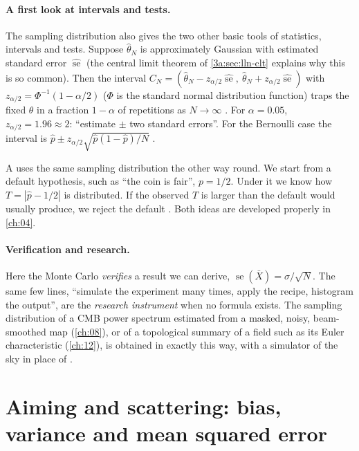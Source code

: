 \paragraph{A first look at intervals and tests.}
The sampling distribution also gives the two other basic tools of
statistics, intervals and tests. Suppose $\hat\theta_N$ is approximately
Gaussian with estimated standard error $\widehat{\operatorname{se}}$ (the
central limit theorem of \cref{3a:sec:lln-clt} explains why this is so
common). Then the interval
$C_N=(\hat\theta_N-z_{\alpha/2}\widehat{\operatorname{se}},\ \hat\theta_N+z_{\alpha/2}\widehat{\operatorname{se}})$
with $z_{\alpha/2}=\Phi^{-1}(1-\alpha/2)$ ($\Phi$ is the standard normal
distribution function) traps the fixed $\theta$ in a
fraction $1-\alpha$ of repetitions as $N\to\infty$ .
For $\alpha=0.05$, $z_{\alpha/2}=1.96\approx2$: ``estimate $\pm$ two standard
errors''. For the
Bernoulli case the interval is
$\hat p\pm z_{\alpha/2}\sqrt{\hat p(1-\hat p)/N}$ .

A  uses the same sampling distribution the other
way round. We start from a default hypothesis, such as ``the coin is fair'',
$p=1/2$. Under it we know how $T=|\hat p-1/2|$ is distributed. If the
observed $T$ is larger than the default would usually produce, we reject the
default . Both ideas are developed properly in
\cref{ch:04}.

\paragraph{Verification and research.}
Here the Monte Carlo \emph{verifies} a result we can derive,
$\operatorname{se}(\bar X)=\sigma/\sqrt N$. The same few lines, ``simulate the
experiment many times, apply the recipe, histogram the output'', are the
\emph{research instrument} when no formula exists. The sampling distribution
of a CMB power spectrum estimated from a masked, noisy, beam-smoothed map
(\cref{ch:08}), or of a topological summary of a field such as its Euler
characteristic (\cref{ch:12}), is obtained in exactly this way, with a
simulator of the sky in place of .

\section{Aiming and scattering: bias, variance and mean squared error}
\label{3a:sec:bias-variance}

